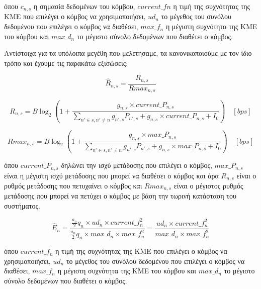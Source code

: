 \vspace{-3pt}

\noindent
όπου $c_{n,s}$ η σημασία δεδομένων του κόμβου, $current\_fn$ η τιμή της συχνότητας της ΚΜΕ που επιλέγει ο κόμβος να χρησιμοποιήσει, $ud_n$ το μέγεθος του συνόλου δεδομένου που επιλέγει ο κόμβος να διαθέσει, $max\_f_n$ η μέγιστη συχνότητα της ΚΜΕ του κόμβου και $max\_d_n$ το μέγιστο σύνολο δεδομένων που διαθέτει ο κόμβος.

Αντίστοιχα για τα υπόλοιπα μεγέθη που μελετήσαμε, τα κανονικοποιούμε με τον ίδιο τρόπο και έχουμε τις παρακάτω εξισώσεις:

\vspace{-5pt}

\begin{equation}
\hat{R}_{n,s} = \frac{R_{n,s}}{Rmax_{n,s}}
\label{eq21}
\end{equation}

\vspace{-3pt}

\[R_{n,s} = B \log_2(1 + \frac{g_{n,s}\times current\_P_{n,s}}{\sum \limits_{n'\in s, n'\neq n} g_{n',s}P_{n',s} + g_{n,s}\times current\_P_{n,s} + I_0}) \quad [bps]\]

\[Rmax_{n,s} = B \log_2(1 + \frac{g_{n,s}\times max\_P_{n,s}}{\sum \limits_{n'\in s, n'\neq n} g_{n',s}P_{n',s} + g_{n,s}\times max\_P_{n,s} + I_0}) \quad [bps]\]

\noindent
όπου $current\_P_{n,s}$ δηλώνει την ισχύ μετάδοσης που επιλέγει ο κόμβος, $max\_P_{n,s}$ είναι η μέγιστη ισχύ μετάδοσης που μπορεί να διαθέσει ο κόμβος και άρα $R_{n,s}$ είναι ο ρυθμός μετάδοσης που πετυχαίνει ο κόμβος και $Rmax_{n,s}$ είναι ο μέγιστος ρυθμός μετάδοσης που μπορεί να πετύχει ο κόμβος με βάση την τωρινή κατάσταση του συστήματος.

\vspace{-5pt}

\begin{equation}
\hat{E}_n=\frac{\frac{a_n}{2}q_n\times ud_n\times current\_f_n^2}{\frac{a_n}{2}q_n\times max\_d_n\times max\_f_n^2} = \frac{ud_n\times current\_f_n^2}{max\_d_n\times max\_f_n^2}
\label{eq22}
\end{equation}

\vspace{-3pt}

\noindent
όπου $current\_f_n$ η τιμή της συχνότητας της ΚΜΕ που επιλέγει ο κόμβος να χρησιμοποιήσει, $ud_n$ το μέγεθος του συνόλου δεδομένου που επιλέγει ο κόμβος να διαθέσει, $max\_f_n$ η μέγιστη συχνότητα της ΚΜΕ του κόμβου και $max\_d_n$ το μέγιστο σύνολο δεδομένων που διαθέτει ο κόμβος.

